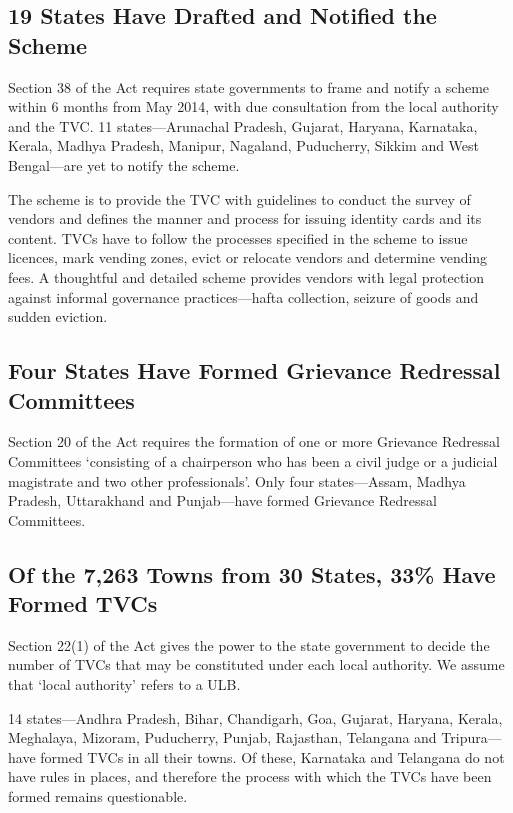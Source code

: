 \documentclass[a4paper, 12pt, twoside, table]{article}
\begin{document}
{\subsection*{19 States Have Drafted and Notified the Scheme}
	Section 38 of the Act requires state governments to frame and notify a scheme within 6 months from May 2014, with due consultation from the local authority and the TVC. 11 states—Arunachal Pradesh, Gujarat, Haryana, Karnataka, Kerala, Madhya Pradesh, Manipur, Nagaland, Puducherry, Sikkim and West Bengal—are yet to notify the scheme.

	The scheme is to provide the TVC with guidelines to conduct the survey of vendors and defines the manner and process for issuing identity cards and its content. TVCs have to follow the processes specified in the scheme to issue licences, mark vending zones, evict or relocate vendors and determine vending fees. A thoughtful and detailed scheme provides vendors with legal protection against informal governance practices—hafta collection, seizure of goods and sudden eviction.

\subsection*{Four States Have Formed Grievance Redressal Committees}
	Section 20 of the Act requires the formation of one or more Grievance Redressal Committees `consisting of a chairperson who has been a civil judge or a judicial magistrate and two other professionals'. Only four states—Assam, Madhya Pradesh, Uttarakhand and Punjab—have formed Grievance Redressal Committees.

\subsection*{Of the 7,263 Towns from 30 States, 33\% Have Formed TVCs}
	Section 22(1) of the Act gives the power to the state government to decide the number of TVCs that may be constituted under each local authority. We assume that ‘local authority’ refers to a ULB.

	14 states—Andhra Pradesh, Bihar, Chandigarh, Goa, Gujarat, Haryana, Kerala, Meghalaya, Mizoram, Puducherry, Punjab, Rajasthan, Telangana and Tripura—have formed TVCs in all their towns. Of these, Karnataka and Telangana do not have rules in places, and therefore the process with which the TVCs have been formed remains questionable.

}
\end{document}

